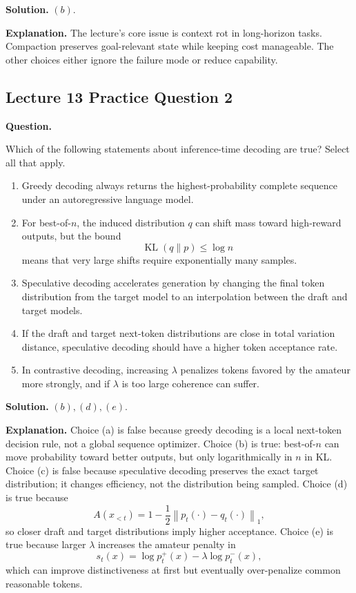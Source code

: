\documentclass[10pt]{article}
\newcommand{\KL}{\operatorname{KL}}
\begin{document}
\textbf{Solution.} \((b)\).

\textbf{Explanation.} The lecture's core issue is context rot in long-horizon tasks. Compaction preserves goal-relevant state while keeping cost manageable. The other choices either ignore the failure mode or reduce capability.

\subsection*{Lecture 13 Practice Question 2}
\textbf{Question.}

Which of the following statements about inference-time decoding are true? Select all that apply.
\begin{enumerate}
\item[(a)] Greedy decoding always returns the highest-probability complete sequence under an autoregressive language model.
\item[(b)] For best-of-\(n\), the induced distribution \(q\) can shift mass toward high-reward outputs, but the bound
\[
\KL(q\|p)\le \log n
\]
means that very large shifts require exponentially many samples.
\item[(c)] Speculative decoding accelerates generation by changing the final token distribution from the target model to an interpolation between the draft and target models.
\item[(d)] If the draft and target next-token distributions are close in total variation distance, speculative decoding should have a higher token acceptance rate.
\item[(e)] In contrastive decoding, increasing \(\lambda\) penalizes tokens favored by the amateur more strongly, and if \(\lambda\) is too large coherence can suffer.
\end{enumerate}

\textbf{Solution.} \((b),(d),(e)\).

\textbf{Explanation.} Choice (a) is false because greedy decoding is a local next-token decision rule, not a global sequence optimizer. Choice (b) is true: best-of-\(n\) can move probability toward better outputs, but only logarithmically in \(n\) in KL. Choice (c) is false because speculative decoding preserves the exact target distribution; it changes efficiency, not the distribution being sampled. Choice (d) is true because
\[
A(x_{<t})=1-\frac{1}{2}\left\lVert p_t(\cdot)-q_t(\cdot)\right\rVert_1,
\]
so closer draft and target distributions imply higher acceptance. Choice (e) is true because larger \(\lambda\) increases the amateur penalty in
\[
s_t(x)=\log p_t^+(x)-\lambda\log p_t^-(x),
\]
which can improve distinctiveness at first but eventually over-penalize common reasonable tokens.
\end{document}
